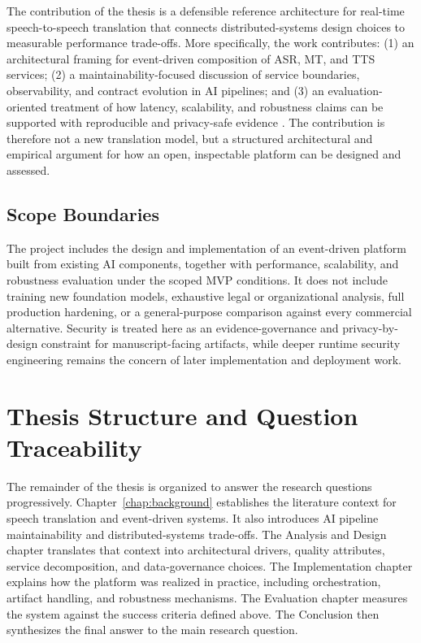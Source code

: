 The contribution of the thesis is a defensible reference architecture for real-time speech-to-speech translation that connects distributed-systems design choices to measurable performance trade-offs. More specifically, the work contributes: (1) an architectural framing for event-driven composition of ASR, MT, and TTS services; (2) a maintainability-focused discussion of service boundaries, observability, and contract evolution in AI pipelines; and (3) an evaluation-oriented treatment of how latency, scalability, and robustness claims can be supported with reproducible and privacy-safe evidence \cite{bass2021softwarearchitectureinpractice,bass2023engineeringai,xu2025scalability}. The contribution is therefore not a new translation model, but a structured architectural and empirical argument for how an open, inspectable platform can be designed and assessed.

\subsection{Scope Boundaries}

The project includes the design and implementation of an event-driven platform built from existing AI components, together with performance, scalability, and robustness evaluation under the scoped MVP conditions. It does not include training new foundation models, exhaustive legal or organizational analysis, full production hardening, or a general-purpose comparison against every commercial alternative. Security is treated here as an evidence-governance and privacy-by-design constraint for manuscript-facing artifacts, while deeper runtime security engineering remains the concern of later implementation and deployment work.

\section{Thesis Structure and Question Traceability}
\label{sec:thesis-structure-traceability}

The remainder of the thesis is organized to answer the research questions progressively. Chapter~\ref{chap:background} establishes the literature context for speech translation and event-driven systems. It also introduces AI pipeline maintainability and distributed-systems trade-offs. The Analysis and Design chapter translates that context into architectural drivers, quality attributes, service decomposition, and data-governance choices. The Implementation chapter explains how the platform was realized in practice, including orchestration, artifact handling, and robustness mechanisms. The Evaluation chapter measures the system against the success criteria defined above. The Conclusion then synthesizes the final answer to the main research question.


